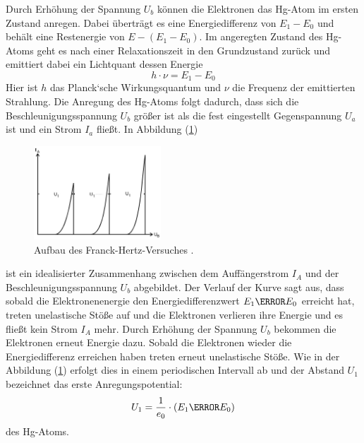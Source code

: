 Durch Erhöhung der Spannung $U_b$ können die Elektronen das Hg-Atom im ersten Zustand anregen.
Dabei überträgt es eine Energiedifferenz von $E_1 - E_0$ und behält eine Restenergie von  $E -(E_1 -E_0)$.
Im angeregten Zustand des Hg-Atoms geht es nach einer Relaxationszeit in den Grundzustand zurück und
emittiert dabei ein Lichtquant dessen Energie
\begin{equation}
  h \cdot \nu = E_1 -E_0
\label{eq:3}
\end{equation}
Hier ist $h$ das Planck‘sche Wirkungsquantum und $\nu$ die Frequenz der emittierten Strahlung.
Die Anregung des Hg-Atoms folgt dadurch, dass sich die Beschleunigungsspannung $U_b$ größer ist als die
fest eingestellt Gegenspannung $U_a$ ist und ein Strom $I_a$ fließt.
In Abbildung (\ref{abb:2})
\begin{figure}[H]
\centering
\includegraphics[width =5 cm, height = 3.5cm]{Verlauf.jpg}
\caption{Aufbau des Franck-Hertz-Versuches \cite{1}.}
\label{abb:2}
\end{figure}
ist ein idealisierter Zusammenhang zwischen dem Auffängerstrom $I_A$ und
der Beschleunigungsspannung $U_b$ abgebildet.
Der Verlauf der Kurve sagt aus, dass sobald die Elektronenenergie den Energiedifferenzwert $E_1 \m E_0$ erreicht hat, treten
unelastische Stöße auf und die Elektronen verlieren ihre Energie und es fließt kein Strom $I_A$ mehr.
Durch Erhöhung der Spannung $U_b$ bekommen die Elektronen erneut Energie dazu.
Sobald die Elektronen wieder die Energiedifferenz erreichen haben treten erneut unelastische Stöße.
Wie in der Abbildung (\ref{abb:2}) erfolgt dies in einem periodischen Intervall ab und
der Abstand $U_1$ bezeichnet das erste Anregungspotential:
\begin{equation}
  U_1 = \frac{1}{e_0} \cdot (E_1 \m E_0)
  \label{eq:3}
\end{equation}
des Hg-Atoms.
